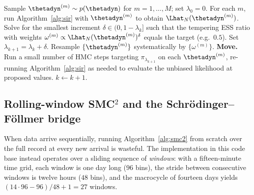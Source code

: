 \begin{algorithm}[H]
\caption{Adaptive-tempered SMC${}^2$ over $\thetadyn$}
\label{alg:smc2}
\begin{algorithmic}[1]
\State Sample $\thetadyn^{(m)} \sim p(\thetadyn)$ for $m=1,\dots,M$;
       set $\lambda_0 = 0$.
\State For each $m$, run Algorithm~\ref{alg:sir} with $\thetadyn^{(m)}$
       to obtain $\Lhat_N(\thetadyn^{(m)})$.
  \State Solve for the smallest increment $\delta \in (0,1-\lambda_k]$
         such that the tempering ESS ratio with weights
         $\omega^{(m)} \propto \Lhat_N(\thetadyn^{(m)})^{\delta}$
         equals the target (e.g.\ $0.5$).
         Set $\lambda_{k+1} = \lambda_k + \delta$.
  \State Resample $\{\thetadyn^{(m)}\}$ systematically by
         $\{\omega^{(m)}\}$.
  \State \textbf{Move.} Run a small number of HMC steps targeting
         $\pi_{\lambda_{k+1}}$ on each $\thetadyn^{(m)}$, re-running
         Algorithm~\ref{alg:sir} as needed to evaluate the unbiased
         likelihood at proposed values.
  \State $k \leftarrow k+1$.
\EndWhile
\end{algorithmic}
\end{algorithm}

\subsection{Rolling-window SMC${}^2$ and the Schr\"odinger--F\"ollmer bridge}

When data arrive sequentially, running Algorithm~\ref{alg:smc2} from
scratch over the full record at every new arrival is wasteful. The
implementation in this code base instead operates over a sliding sequence
of \emph{windows}: with a fifteen-minute time grid, each window is one
day long ($96$ bins), the stride between consecutive windows is twelve
hours ($48$ bins), and the macrocycle of fourteen days yields
$(14 \cdot 96 - 96)/48 + 1 = 27$ windows.

